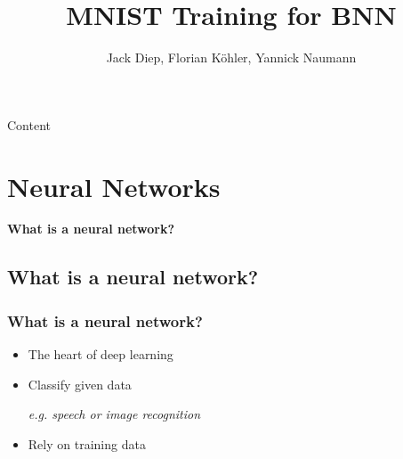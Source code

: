 \documentclass[aspectratio=1610, 12pt]{beamer}
\title{MNIST Training for BNN}
\author[Diep, Köhler, Naumann]{Jack Diep, Florian Köhler, Yannick Naumann}
\institute[BNN-Training]{Design Your Own CPU - Design of Embedded Systems}
\begin{document}
\maketitle




\begin{frame}{Content}
	\tableofcontents


\end{frame}
\section{Neural Networks}

\begin{frame}
	\centering
	\vfill
	\textbf{\Large What is a neural network?}
	\vfill
\end{frame}

\subsection{What is a neural network?}

\begin{frame}
	\frametitle{What is a neural network?}

	\begin{itemize}
		\item<+-> The heart of deep learning
		\item<+-> Classify given data

		\emph{e.g. speech or image recognition}

		\item<+-> Rely on training data
	\end{itemize}

\end{frame}
\end{document}
